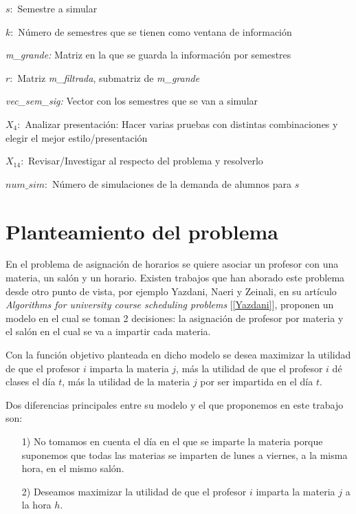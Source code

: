 $s:$ Semestre a simular

$k:$ Número de semestres que se tienen como ventana de información

\textit{m\_grande:} Matriz en la que se guarda la información por semestres

$r:$ Matriz \textit{m\_filtrada}, submatriz de \textit{m\_grande}

\textit{vec\_sem\_sig:} Vector con los semestres que se van a simular

$X_{4}:$ Analizar presentación: Hacer varias pruebas con distintas combinaciones y elegir el mejor estilo/presentación

$X_{14}:$ Revisar/Investigar al respecto del problema y resolverlo

$num\_sim:$ Número de simulaciones de la demanda de alumnos para $s$

%
%
%
%

\section{Planteamiento del problema}

En el problema de asignación de horarios se quiere asociar un profesor con una materia, un salón y un horario. Existen trabajos que han aborado este problema desde otro punto de vista, por ejemplo Yazdani, Naeri y Zeinali, en su artículo \textit{Algorithms for university course scheduling problems} [\ref{Yazdani}], proponen un modelo en el cual se toman 2 decisiones: la asignación de profesor por materia y el salón en el cual se va a impartir cada materia.

Con la función objetivo planteada en dicho modelo se desea maximizar la utilidad de que el profesor $i$ imparta la materia $j$, más la utilidad de que el profesor $i$ dé clases el día $t$, más la utilidad de la materia $j$ por ser impartida en el día $t$.

Dos diferencias principales entre su modelo y el que proponemos en este trabajo son:

\begin{enumerate}
\item[1)] No tomamos en cuenta el día en el que se imparte la materia porque suponemos que todas las materias se imparten de lunes a viernes, a la misma hora, en el mismo salón.

\item[2)] Deseamos maximizar la utilidad de que el profesor $i$ imparta la materia $j$ a la hora $h$.
\end{enumerate}

